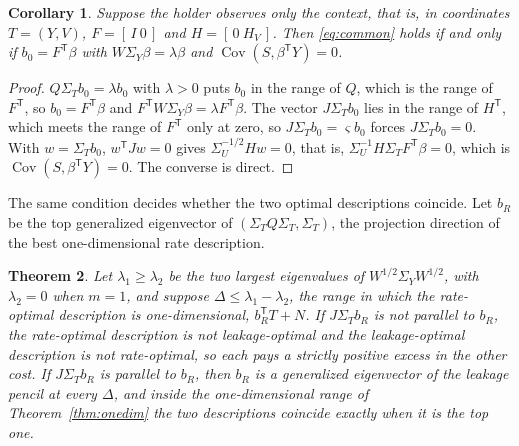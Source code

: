 \documentclass[11pt,onecolumn]{IEEEtran}
\newtheorem{theorem}{Theorem}
\newtheorem{corollary}[theorem]{Corollary}
\newcommand{\Cov}{\operatorname{Cov}}
\begin{document}
\begin{corollary}\label{cor:context}
Suppose the holder observes only the context, that is, in coordinates $T=(Y,V)$,
$F=[\,I\ 0\,]$ and $H=[\,0\ H_V\,]$. Then \eqref{eq:common} holds if
and only if $b_0=F^{\mathsf T}\beta$ with $W\Sigma_Y\beta=\lambda\beta$ and
$\Cov(S,\beta^{\mathsf T}Y)=0$.
\end{corollary}

\begin{proof}
$Q\Sigma_Tb_0=\lambda b_0$ with $\lambda>0$ puts $b_0$ in the range of
$Q$, which is the range of $F^{\mathsf T}$, so $b_0=F^{\mathsf T}\beta$
and $F^{\mathsf T}W\Sigma_Y\beta=\lambda F^{\mathsf T}\beta$. The vector
$J\Sigma_Tb_0$ lies in the range of $H^{\mathsf T}$, which meets the
range of $F^{\mathsf T}$ only at zero, so $J\Sigma_Tb_0=\varsigma b_0$
forces $J\Sigma_Tb_0=0$. With $w=\Sigma_Tb_0$, $w^{\mathsf T}Jw=0$ gives
$\Sigma_U^{-1/2}Hw=0$, that is,
$\Sigma_U^{-1}H\Sigma_TF^{\mathsf T}\beta=0$, which is
$\Cov(S,\beta^{\mathsf T}Y)=0$. The converse is direct.
\end{proof}

The same condition decides whether the two optimal descriptions coincide.
Let $b_R$ be the top generalized eigenvector of
$(\Sigma_TQ\Sigma_T,\Sigma_T)$, the projection direction of the best
one-dimensional rate description.

\begin{theorem}\label{thm:misalign}
Let $\lambda_1\ge\lambda_2$ be the two largest eigenvalues of
$W^{1/2}\Sigma_YW^{1/2}$, with $\lambda_2=0$ when $m=1$, and suppose $\Delta\le\lambda_1-\lambda_2$, the
range in which the rate-optimal description is one-dimensional,
$b_R^{\mathsf T}T+N$. If $J\Sigma_Tb_R$ is not parallel to $b_R$, the
rate-optimal description is not leakage-optimal and the leakage-optimal
description is not rate-optimal, so each pays a strictly positive excess
in the other cost. If $J\Sigma_Tb_R$ is parallel to $b_R$, then $b_R$ is a
generalized eigenvector of the leakage pencil at every $\Delta$, and
inside the one-dimensional range of Theorem~\ref{thm:onedim} the two
descriptions coincide exactly when it is the top one.
\end{theorem}
\end{document}
